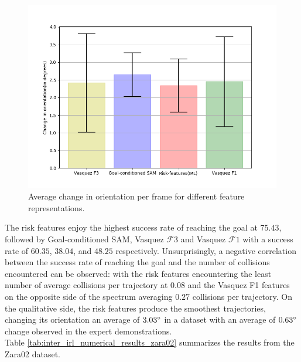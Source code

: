 \begin{figure}[htbp]
	\includegraphics[width=.95\linewidth]{plots/plot_without_outliers/zara02_inter_irl_no_outlier/compute_trajectory_smoothness_zara02_no_outlier_inter_irl.png}
	\caption{Average change in orientation per frame for different feature representations.}
	\label{fig:inter_irl-trajectory_smoothness-zara02}
\end{figure}

 The risk features enjoy the highest success rate of reaching the goal at $75.43$, followed by Goal-conditioned SAM, Vasquez $\mathcal{F}3$ and Vasquez $\mathcal{F}1$ with a success rate of $60.35$, $38.04$, and $48.25$ respectively. Unsurprisingly, a negative correlation between the success rate of reaching the goal and the number of collisions encountered can be observed: with the risk features encountering the least number of average collisions per trajectory at $0.08$ and the Vasquez F1 features on the opposite side of the spectrum averaging $0.27$ collisions per trajectory.  
On the qualitative side, the risk features produce the smoothest trajectories, changing its orientation an average of $3.03\degree$ in a dataset with an average of $0.63\degree$ change observed in the expert demonstrations. \\
Table \autoref{tab:inter_irl_numerical_results_zara02} summarizes the results from the Zara02 dataset.


